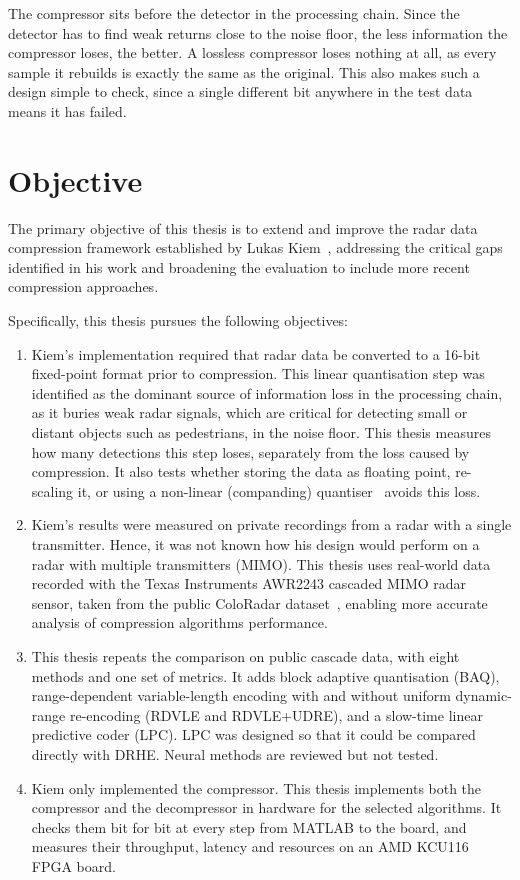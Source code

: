 \label{sec:lossless}
The compressor sits before the detector in the processing chain. Since the
detector has to find weak returns close to the noise floor, the less
information the compressor loses, the better. A lossless compressor loses
nothing at all, as every sample it rebuilds is exactly the same as the
original. This also makes such a design simple to check, since a single
different bit anywhere in the test data means it has failed.

\section{Objective}
\label{sec:objectives}

The primary objective of this thesis is to extend and improve the radar data compression framework established by Lukas Kiem~\cite{kiem2025}, addressing the critical gaps identified in his work and broadening the evaluation to include more recent compression approaches.

Specifically, this thesis pursues the following objectives:

\begin{enumerate}
    \item Kiem's implementation required that radar data be converted to a 16-bit fixed-point format prior to compression. This linear quantisation step was identified as the dominant source of information loss in the processing chain, as it buries weak radar signals, which are critical for detecting small or distant objects such as pedestrians, in the noise floor. This thesis measures how many detections this step loses, separately from the loss caused by compression. It also tests whether storing the data as floating point, re-scaling it, or using a non-linear (companding) quantiser~\cite{deng2024} avoids this loss.

    \item Kiem's results were measured on private recordings from a radar with a single transmitter. Hence, it was not known how his design would perform on a radar with multiple transmitters (MIMO). This thesis uses real-world data recorded with the Texas Instruments AWR2243 cascaded MIMO radar sensor, taken from the public ColoRadar dataset~\cite{kramer2022}\label{lit:kramer:intro}, enabling more accurate analysis of compression algorithms performance.

    \item This thesis repeats the comparison on public cascade data, with eight methods and one set of metrics. It adds block adaptive quantisation (BAQ), range-dependent variable-length encoding with and without uniform dynamic-range re-encoding (RDVLE and RDVLE+UDRE), and a slow-time linear predictive coder (LPC). LPC was designed so that it could be compared directly with DRHE. Neural methods are reviewed but not tested.

    \item Kiem only implemented the compressor. This thesis implements both the compressor and the decompressor in hardware for the selected algorithms. It checks them bit for bit at every step from MATLAB to the board, and measures their throughput, latency and resources on an AMD KCU116 FPGA board.
\end{enumerate}

